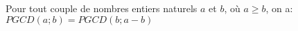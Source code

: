 
Pour tout couple de nombres entiers naturels $a$ et $b$, où $a \geq b$, on a: \\
$PGCD(a;b)=PGCD(b;a-b)$
